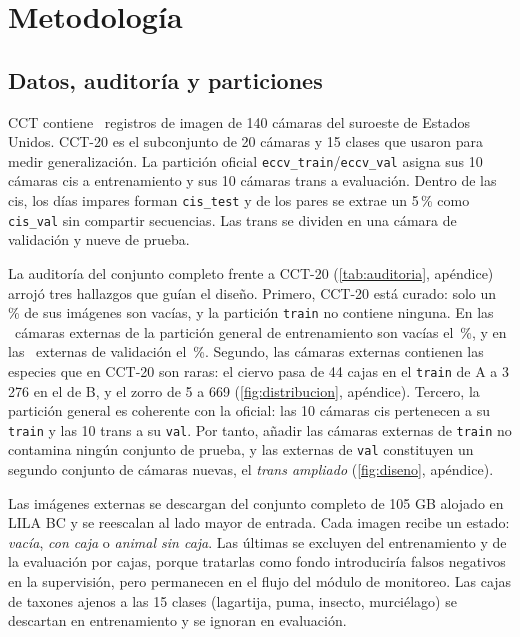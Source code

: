 \documentclass{article}
\begin{document}
\section{Metodología}
\label{sec:metodo}

\subsection{Datos, auditoría y particiones}
\label{sec:datos}
CCT contiene \nImagenesTotal\ registros de imagen de 140 cámaras del suroeste de Estados Unidos. CCT-20 es el subconjunto de 20 cámaras y 15 clases que \textcite{beery2018} usaron para medir generalización. La partición oficial \texttt{eccv\_train}/\texttt{eccv\_val} asigna sus 10 cámaras cis a entrenamiento y sus 10 cámaras trans a evaluación. Dentro de las cis, los días impares forman \texttt{cis\_test} y de los pares se extrae un 5\,\% como \texttt{cis\_val} sin compartir secuencias. Las trans se dividen en una cámara de validación y nueve de prueba.

La auditoría del conjunto completo frente a CCT-20 (\cref{tab:auditoria}, apéndice) arrojó tres hallazgos que guían el diseño. Primero, CCT-20 está curado: solo un \pctVaciasVeinte\,\% de sus imágenes son vacías, y la partición \texttt{train} no contiene ninguna. En las \nUbicExtTrain\ cámaras externas de la partición general de entrenamiento son vacías el \pctVaciasExtTrain\,\%, y en las \nUbicExtVal\ externas de validación el \pctVaciasExtVal\,\%. Segundo, las cámaras externas contienen las especies que en CCT-20 son raras: el ciervo pasa de 44 cajas en el \texttt{train} de A a 3\,276 en el de B, y el zorro de 5 a 669 (\cref{fig:distribucion}, apéndice). Tercero, la partición general es coherente con la oficial: las 10 cámaras cis pertenecen a su \texttt{train} y las 10 trans a su \texttt{val}. Por tanto, añadir las cámaras externas de \texttt{train} no contamina ningún conjunto de prueba, y las externas de \texttt{val} constituyen un segundo conjunto de cámaras nuevas, el \emph{trans ampliado} (\cref{fig:diseno}, apéndice).

Las imágenes externas se descargan del conjunto completo de 105 GB alojado en LILA BC y se reescalan al lado mayor de entrada. Cada imagen recibe un estado: \emph{vacía}, \emph{con caja} o \emph{animal sin caja}. Las últimas se excluyen del entrenamiento y de la evaluación por cajas, porque tratarlas como fondo introduciría falsos negativos en la supervisión, pero permanecen en el flujo del módulo de monitoreo. Las cajas de taxones ajenos a las 15 clases (lagartija, puma, insecto, murciélago) se descartan en entrenamiento y se ignoran en evaluación.
\end{document}
